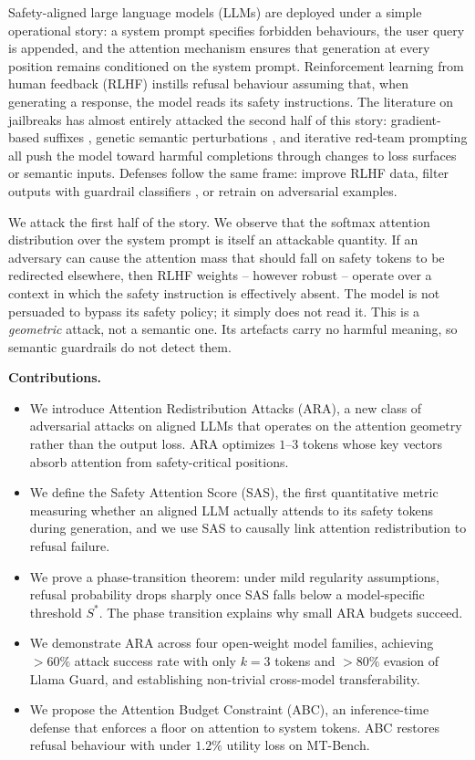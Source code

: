 \documentclass[sigconf,anonymous=false,review=false]{acmart}
\theoremstyle{definition}
\theoremstyle{remark}
\begin{document}
Safety-aligned large language models (LLMs) are deployed under a simple operational story: a system prompt specifies forbidden behaviours, the user query is appended, and the attention mechanism ensures that generation at every position remains conditioned on the system prompt. Reinforcement learning from human feedback (RLHF) \cite{ouyang2022training} instills refusal behaviour assuming that, when generating a response, the model reads its safety instructions. The literature on jailbreaks has almost entirely attacked the second half of this story: gradient-based suffixes \cite{zou2023universal}, genetic semantic perturbations \cite{liu2023autodan}, and iterative red-team prompting \cite{chao2023pair} all push the model toward harmful completions through changes to loss surfaces or semantic inputs. Defenses follow the same frame: improve RLHF data, filter outputs with guardrail classifiers \cite{inan2023llamaguard}, or retrain on adversarial examples.

We attack the first half of the story. We observe that the softmax attention distribution over the system prompt is itself an attackable quantity. If an adversary can cause the attention mass that should fall on safety tokens to be redirected elsewhere, then RLHF weights -- however robust -- operate over a context in which the safety instruction is effectively absent. The model is not persuaded to bypass its safety policy; it simply does not read it. This is a \emph{geometric} attack, not a semantic one. Its artefacts carry no harmful meaning, so semantic guardrails do not detect them.

\textbf{Contributions.}
\begin{itemize}
  \item We introduce Attention Redistribution Attacks (ARA), a new class of adversarial attacks on aligned LLMs that operates on the attention geometry rather than the output loss. ARA optimizes $1$--$3$ tokens whose key vectors absorb attention from safety-critical positions.
  \item We define the Safety Attention Score (SAS), the first quantitative metric measuring whether an aligned LLM actually attends to its safety tokens during generation, and we use SAS to causally link attention redistribution to refusal failure.
  \item We prove a phase-transition theorem: under mild regularity assumptions, refusal probability drops sharply once SAS falls below a model-specific threshold $S^*$. The phase transition explains why small ARA budgets succeed.
  \item We demonstrate ARA across four open-weight model families, achieving $>60\%$ attack success rate with only $k{=}3$ tokens and $>80\%$ evasion of Llama Guard, and establishing non-trivial cross-model transferability.
  \item We propose the Attention Budget Constraint (ABC), an inference-time defense that enforces a floor on attention to system tokens. ABC restores refusal behaviour with under $1.2\%$ utility loss on MT-Bench.
\end{itemize}
\end{document}
